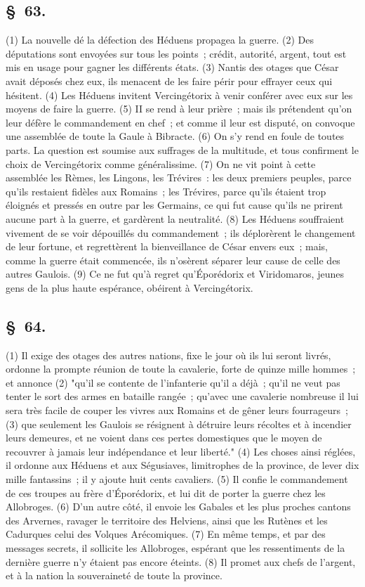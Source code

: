 \documentclass[french,twoside]{book} %
\begin{document}
\subsection[{§ 63.}]{ \textsc{§ 63.} }
\noindent (1) La nouvelle dé la défection des Héduens propagea la guerre. (2) Des députations sont envoyées sur tous les points ; crédit, autorité, argent, tout est mis en usage pour gagner les différents états. (3) Nantis des otages que César avait déposés chez eux, ils menacent de les faire périr pour effrayer ceux qui hésitent. (4) Les Héduens invitent Vercingétorix à venir conférer avec eux sur les moyens de faire la guerre. (5) II se rend à leur prière ; mais ils prétendent qu’on leur défère le commandement en chef ; et comme il leur est disputé, on convoque une assemblée de toute la Gaule à Bibracte. (6) On s’y rend en foule de toutes parts. La question est soumise aux suffrages de la multitude, et tous confirment le choix de Vercingétorix comme généralissime. (7) On ne vit point à cette assemblée les Rèmes, les Lingons, les Trévires : les deux premiers peuples, parce qu’ils restaient fidèles aux Romains ; les Trévires, parce qu’ils étaient trop éloignés et pressés en outre par les Germains, ce qui fut cause qu’ils ne prirent aucune part à la guerre, et gardèrent la neutralité. (8) Les Héduens souffraient vivement de se voir dépouillés du commandement ; ils déplorèrent le changement de leur fortune, et regrettèrent la bienveillance de César envers eux ; mais, comme la guerre était commencée, ils n’osèrent séparer leur cause de celle des autres Gaulois. (9) Ce ne fut qu’à regret qu’Éporédorix et Viridomaros, jeunes gens de la plus haute espérance, obéirent à Vercingétorix.
\subsection[{§ 64.}]{ \textsc{§ 64.} }
\noindent (1) Il exige des otages des autres nations, fixe le jour où ils lui seront livrés, ordonne la prompte réunion de toute la cavalerie, forte de quinze mille hommes ; et annonce (2) "qu’il se contente de l’infanterie qu’il a déjà ; qu’il ne veut pas tenter le sort des armes en bataille rangée ; qu’avec une cavalerie nombreuse il lui sera très facile de couper les vivres aux Romains et de gêner leurs fourrageurs ; (3) que seulement les Gaulois se résignent à détruire leurs récoltes et à incendier leurs demeures, et ne voient dans ces pertes domestiques que le moyen de recouvrer à jamais leur indépendance et leur liberté." (4) Les choses ainsi réglées, il ordonne aux Héduens et aux Ségusiaves, limitrophes de la province, de lever dix mille fantassins ; il y ajoute huit cents cavaliers. (5) Il confie le commandement de ces troupes au frère d’Éporédorix, et lui dit de porter la guerre chez les Allobroges. (6) D'un autre côté, il envoie les Gabales et les plus proches cantons des Arvernes, ravager le territoire des Helviens, ainsi que les Rutènes et les Cadurques celui des Volques Arécomiques. (7) En même temps, et par des messages secrets, il sollicite les Allobroges, espérant que les ressentiments de la dernière guerre n’y étaient pas encore éteints. (8) Il promet aux chefs de l’argent, et à la nation la souveraineté de toute la province.
\end{document}
